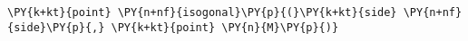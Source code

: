 \begin{Verbatim}[commandchars=\\\{\}]
    \PY{k+kt}{point} \PY{n+nf}{isogonal}\PY{p}{(}\PY{k+kt}{side} \PY{n+nf}{side}\PY{p}{,} \PY{k+kt}{point} \PY{n}{M}\PY{p}{)}
\end{Verbatim}
